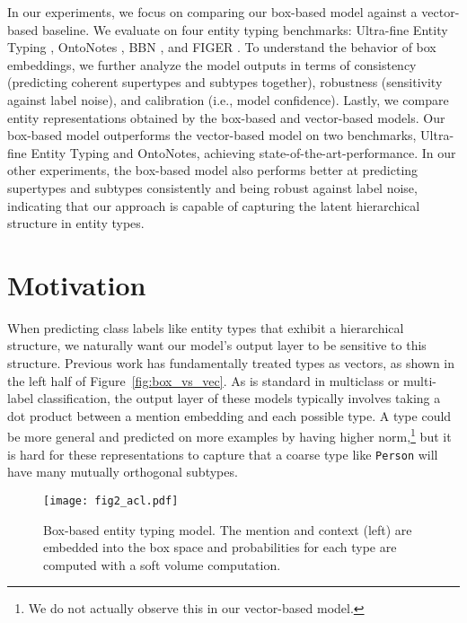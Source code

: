 \documentclass[11pt,a4paper]{article}
\newcommand{\greg}[1]{\textcolor{red}{\textbf{GREG:} #1}}
\begin{document}
In our experiments, we focus on comparing our box-based model against a vector-based baseline. We evaluate on four entity typing benchmarks: Ultra-fine Entity Typing \citep{Eunsol_Choi_18}, OntoNotes \citep{Dan_Gillick_14}, BBN \cite{bbn}, and FIGER \citep{Xiao_Ling_12}. To understand the behavior of box embeddings, we further analyze the model outputs in terms of consistency (predicting coherent supertypes and subtypes together), robustness (sensitivity against label noise), and calibration (i.e., model confidence). Lastly, we compare entity representations obtained by the box-based and vector-based models. Our box-based model outperforms the vector-based model on two benchmarks, Ultra-fine Entity Typing and OntoNotes, achieving state-of-the-art-performance. In our other experiments, the box-based model also performs better at predicting supertypes and subtypes consistently and being robust against label noise, indicating that our approach is capable of capturing the latent hierarchical structure in entity types.






\section{Motivation}\label{sec:motivation}

When predicting class labels like entity types that exhibit a hierarchical structure, we naturally want our model's output layer to be sensitive to this structure. Previous work \cite[inter alia]{Xiang_Ren_16a,sonse_shimaoka_17,Eunsol_Choi_18,Yasumasa_Onoe_19} has fundamentally treated types as vectors, as shown in the left half of Figure~\ref{fig:box_vs_vec}. As is standard in multiclass or multi-label classification, the output layer of these models typically involves taking a dot product between a mention embedding and each possible type. A type could be more general and predicted on more examples by having higher norm,\footnote{We do not actually observe this in our vector-based model.} but it is hard for these representations to capture that a coarse type like {\tt Person} will have many mutually orthogonal subtypes.



\begin{figure*}[!t]
    \centering
    \texttt{[image: fig2\_acl.pdf]}
    \caption{Box-based entity typing model. The mention and context (left) are embedded into the box space and probabilities for each type are computed with a soft volume computation.}
    \label{fig:box_classifier}
    \vspace{-3pt}
\end{figure*}
\end{document}
